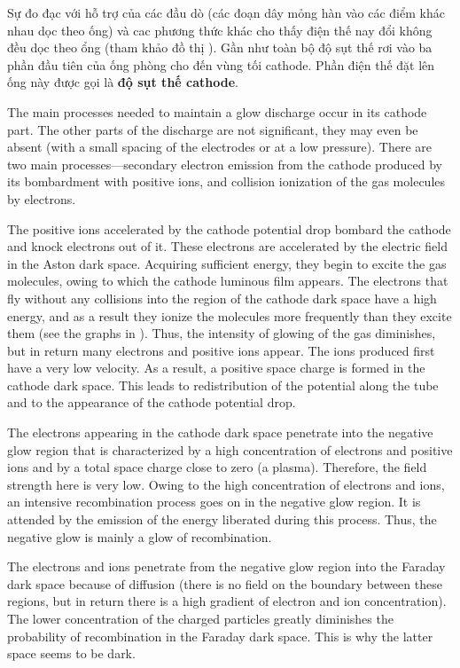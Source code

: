 Sự đo đạc với hỗ trợ của các đầu dò (các đoạn dây mỏng hàn vào các điểm khác nhau dọc theo ống) và cac phương thức khác cho thấy điện thế nay đổi không đều dọc theo ổng (tham khảo đồ thị ).
Gần như toàn bộ độ sụt thế rơi vào ba phần đầu tiên của ống phòng cho đến vùng tối cathode.
Phần điện thế đặt lên ống này được gọi là \textbf{độ sụt thế cathode}.

The main processes needed to maintain a glow discharge occur in its cathode part.
The other parts of the discharge are not significant, they may even be absent (with a small spacing of the electrodes or at a low pressure).
There are two main processes---secondary electron emission from the cathode produced by its bombardment with positive ions, and collision ionization of the gas molecules by electrons.

The positive ions accelerated by the cathode potential drop bombard the cathode and knock electrons out of it.
These electrons are accelerated by the electric field in the Aston dark space.
Acquiring sufficient energy, they begin to excite the gas molecules, owing to which the cathode luminous film appears.
The electrons that fly without any collisions into the region of the cathode dark space have a high energy, and as a result they ionize the molecules more frequently than they excite them (see the graphs in ).
Thus, the intensity of glowing of the gas diminishes, but in return many electrons and positive ions appear.
The ions produced first have a very low velocity.
As a result, a positive space charge is formed in the cathode dark space.
This leads to redistribution of the potential along the tube and to the appearance of the cathode potential drop.

The electrons appearing in the cathode dark space penetrate into the negative glow region that is characterized by a high concentration of electrons and positive ions and by a total space charge close
to zero (a plasma).
Therefore, the field strength here is very low.
Owing to the high concentration of electrons and ions, an intensive recombination process goes on in the negative glow region.
It is attended by the emission of the energy liberated during this process. Thus,
the negative glow is mainly a glow of recombination.

The electrons and ions penetrate from the negative glow region into the Faraday dark space because of diffusion (there is no field on the boundary between these regions, but in return there is a high gradient of electron and ion concentration).
The lower concentration of the charged particles greatly diminishes the probability of recombination in the Faraday dark space.
This is why the latter space seems to be dark.

